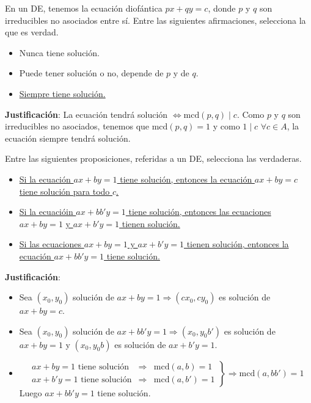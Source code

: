 \begin{ejercicio}
    En un DE, tenemos la ecuación diofántica $px+qy=c$, donde $p$ y $q$ son irreducibles no asociados entre sí. Entre las siguientes afirmaciones, selecciona la que es verdad.
    \begin{itemize}
        \item Nunca tiene solución.
        \item Puede tener solución o no, depende de $p$ y de $q$. 
        \item \underline{Siempre tiene solución.}
    \end{itemize}

    \noindent
    \textbf{Justificación}:
    La ecuación tendrá solución $\Longleftrightarrow \text{mcd}(p,q)\mid c$. Como $p$ y $q$ son irreducibles no asociados, tenemos que $\text{mcd}(p,q)=1$ y como $1\mid c$ $\forall c \in A$, la ecuación siempre tendrá solución.
\end{ejercicio}

\begin{ejercicio}
    Entre las siguientes proposiciones, referidas a un DE, selecciona las verdaderas.
    \begin{itemize}
    \item \underline{Si la ecuación $ax+by=1$ tiene solución, entonces la ecuación $ax+by=c$} \newline
        \underline{tiene solución para todo $c$.}
\item \underline{Si la ecuacióin $ax+bb'y=1$ tiene solución, entonces las ecuaciones $ax+by=1$}
    \underline{y $ax+b'y=1$ tienen solución.} 
\item \underline{Si las ecuaciones $ax+by=1$ y $ax+b'y=1$ tienen solución, entonces la }\newline
    \underline{ecuación $ax+bb'y=1$ tiene solución.}
    \end{itemize}

    \noindent
    \textbf{Justificación}:
    \begin{itemize}
        \item Sea $(x_0,y_0)$ solución de $ax+by=1 \Longrightarrow (cx_0, cy_0)$ es solución de $ax+by=c$.
        \item Sea $(x_0,y_0)$ solución de $ax+bb'y=1 \Longrightarrow (x_0, y_0b')$ es solución de $ax+by=1$ y $(x_0, y_0b)$ es solución de $ax+b'y=1$.
        \item 
            \begin{equation*}
                \left.
                    \begin{array}{lcr}
                        ax+by=1 \text{\ tiene\ solución} & \Longrightarrow & \text{mcd}(a,b)=1 \\
                        ax+b'y=1 \text{\ tiene\ solución} & \Longrightarrow & \text{mcd}(a,b')=1
                    \end{array}
                \right\} \Longrightarrow \text{mcd}(a,bb')=1
            \end{equation*}
            Luego $ax+bb'y=1$ tiene solución. 
    \end{itemize}
\end{ejercicio}

\newpage
\resetearcontador
